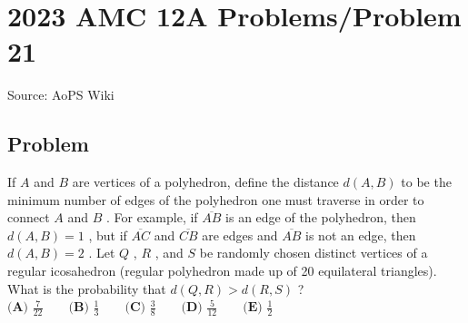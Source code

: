 \documentclass[12pt]{article}
\begin{document}
\section*{{2023 AMC 12A Problems/Problem 21}}
Source: AoPS Wiki

\subsection*{Problem}
If $A$ and $B$ are vertices of a polyhedron, define the distance $d(A,B)$ to be the minimum number of edges of the polyhedron one must traverse in order to connect $A$ and $B$ . For example, if $\overline{AB}$ is an edge of the polyhedron, then $d(A, B) = 1$ , but if $\overline{AC}$ and $\overline{CB}$ are edges and $\overline{AB}$ is not an edge, then $d(A, B) = 2$ . Let $Q$ , $R$ , and $S$ be randomly chosen distinct vertices of a regular icosahedron (regular polyhedron made up of 20 equilateral triangles). What is the probability that $d(Q, R) > d(R, S)$ ? $\textbf{(A) } \frac{7}{22} \qquad \textbf{(B) } \frac{1}{3} \qquad \textbf{(C) } \frac{3}{8} \qquad \textbf{(D) } \frac{5}{12} \qquad \textbf{(E) } \frac{1}{2}$
\end{document}
